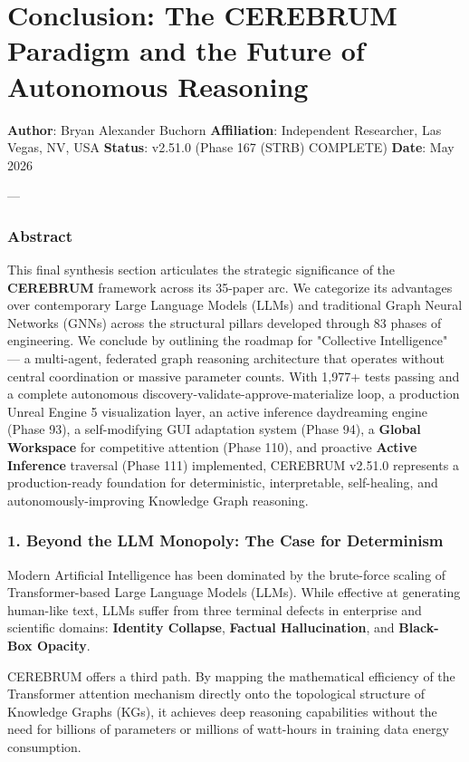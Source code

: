 \section{Conclusion: The CEREBRUM Paradigm and the Future of Autonomous Reasoning}

\textbf{Author}: Bryan Alexander Buchorn  
\textbf{Affiliation}: Independent Researcher, Las Vegas, NV, USA  
\textbf{Status}: v2.51.0 (Phase 167 (STRB) COMPLETE)
\textbf{Date}: May 2026

---

\subsubsection{Abstract}
This final synthesis section articulates the strategic signi\-ficance of the \textbf{CEREBRUM} framework across its 35-paper arc. We categorize its advantages over conte\-mporary Large Language Models (LLMs) and traditional Graph Neural Networks (GNNs) across the structural pillars developed through 83 phases of engineering. We conclude by outlining the roadmap for "Collective Intell\-igence" — a multi-agent, federated graph reasoning archi\-tecture that operates without central coord\-ination or massive parameter counts. With 1,977+ tests passing and a complete autonomous discovery-validate-approve-materialize loop, a production Unreal Engine 5 visua\-lization layer, an active inference daydreaming engine (Phase 93), a self-modifying GUI adaptation system (Phase 94), a \textbf{Global Workspace} for competitive attention (Phase 110), and proactive \textbf{Active Inference} traversal (Phase 111) implemented, CEREBRUM v2.51.0 represents a production-ready foundation for deter\-ministic, inter\-pretable, self-healing, and auton\-omously-improving Knowledge Graph reasoning.

\subsubsection{1. Beyond the LLM Monopoly: The Case for Determinism}
Modern Artificial Intell\-igence has been dominated by the brute-force scaling of Transformer-based Large Language Models (LLMs). While effective at generating human-like text, LLMs suffer from three terminal defects in enterprise and scientific domains: \textbf{Identity Collapse}, \textbf{Factual Halluc\-ination}, and \textbf{Black-Box Opacity}.

CEREBRUM offers a third path. By mapping the mathe\-matical efficiency of the Transformer attention mechanism directly onto the topological structure of Knowledge Graphs (KGs), it achieves deep reasoning capab\-ilities without the need for billions of parameters or millions of watt-hours in training data energy consumption.

